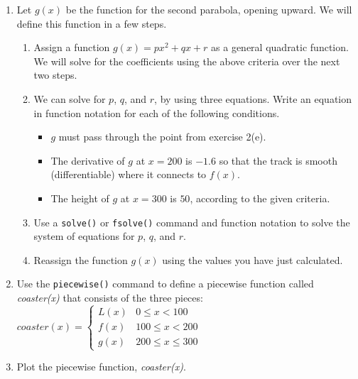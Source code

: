 \begin{enumerate}
	\item Let $g(x)$ be the function for the second parabola, opening upward. We will define this function in a few steps.
	\begin{enumerate}
		\item Assign a function $g(x)=px^2+qx+r$ as a general quadratic function. We will solve for the coefficients using the above criteria over the next two steps.
		\item We can solve for $p$, $q$, and $r$, by using three equations. Write an equation in function notation for each of the following conditions.
			\begin{itemize}
			\item $g$ must pass through the point from exercise 2(e).
			\item The derivative of $g$ at $x=200$ is $-1.6$ so that the track is smooth (differentiable) where it connects to $f(x)$.
			\item The height of $g$ at $x=300$ is $50$, according to the given criteria.
			\end{itemize}
		\item Use a \texttt{solve()} or \texttt{fsolve()} command and function notation to solve the system of equations for $p$, $q$, and $r$.
		\item Reassign the function $g(x)$ using the values you have just calculated.
	\end{enumerate}
	\item Use the \texttt{piecewise()} command to define a piecewise function called \textit{coaster(x)} that consists of the three pieces:\\
		$coaster(x) = \left\lbrace
			\begin{array}{ll}
			L(x)	&	0 \leq x < 100 \\
			f(x)	&	100 \leq x < 200 \\
			g(x)	&	200 \leq x \leq 300
			\end{array}
		\right.$
	\item Plot the piecewise function, \textit{coaster(x)}.
\end{enumerate}